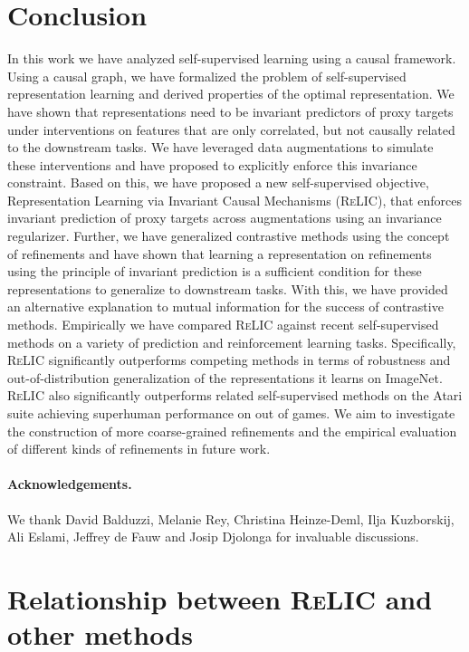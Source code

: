 \documentclass{article}
\newcommand{\relic}{\textsc{ReLIC}}
\begin{document}
 \section{Conclusion}

In this work we have analyzed self-supervised learning using a causal framework. 
Using a causal graph, we have formalized the problem of self-supervised representation learning and derived properties of the optimal representation.
We have shown that representations need to be invariant predictors of proxy targets under interventions on features that are only correlated, but not causally related to the downstream tasks.
We have leveraged data augmentations to simulate these interventions and have proposed to explicitly enforce this invariance constraint.
Based on this, we have proposed a new self-supervised objective, Representation Learning via Invariant Causal Mechanisms (\relic{}), that enforces invariant prediction of proxy targets across augmentations using an invariance regularizer.
Further, we have generalized contrastive methods using the concept of refinements and have shown that learning a representation on refinements using the principle of invariant prediction is a sufficient condition for these representations to generalize to downstream tasks.
With this, we have provided an alternative explanation to mutual information for the success of contrastive methods.
Empirically we have compared \relic{} against recent self-supervised methods on a variety of prediction and reinforcement learning tasks.
Specifically, \relic{} significantly outperforms competing methods in terms of robustness and out-of-distribution generalization of the representations it learns on ImageNet. \relic{} also significantly outperforms related self-supervised methods on the Atari suite achieving superhuman performance on  out of  games.
We aim to investigate the construction of more coarse-grained refinements and the empirical evaluation of different kinds of refinements in future work.
 
\paragraph{Acknowledgements.} We thank David Balduzzi, Melanie Rey, Christina Heinze-Deml, Ilja Kuzborskij, Ali Eslami, Jeffrey de Fauw and Josip Djolonga for invaluable discussions.





\appendix
\onecolumn
\section{Relationship between \relic{} and other methods} \label{sec:relationship}
\end{document}
